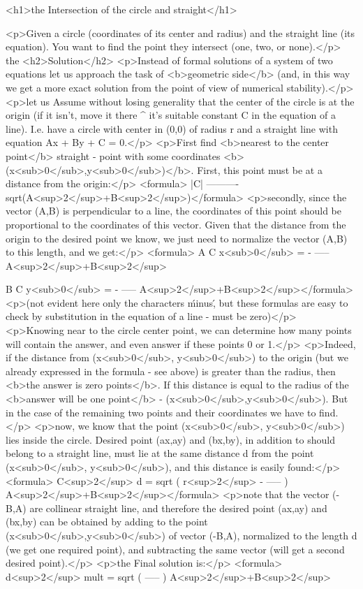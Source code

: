 <h1>the Intersection of the circle and straight</h1>

<p>Given a circle (coordinates of its center and radius) and the straight line (its equation). You want to find the point they intersect (one, two, or none).</p>
the <h2>Solution</h2>
<p>Instead of formal solutions of a system of two equations let us approach the task of <b>geometric side</b> (and, in this way we get a more exact solution from the point of view of numerical stability).</p>
<p>let us Assume without losing generality that the center of the circle is at the origin (if it isn't, move it there ^ it's suitable constant C in the equation of a line). I.e. have a circle with center in (0,0) of radius r and a straight line with equation Ax + By + C = 0.</p>
<p>First find <b>nearest to the center point</b> straight - point with some coordinates <b>(x<sub>0</sub>,y<sub>0</sub>)</b>. First, this point must be at a distance from the origin:</p>
<formula> |C|
----------
sqrt(A<sup>2</sup>+B<sup>2</sup>)</formula>
<p>secondly, since the vector (A,B) is perpendicular to a line, the coordinates of this point should be proportional to the coordinates of this vector. Given that the distance from the origin to the desired point we know, we just need to normalize the vector (A,B) to this length, and we get:</p>
<formula> A C
x<sub>0</sub> = - -----
A<sup>2</sup>+B<sup>2</sup>

B C
y<sub>0</sub> = - -----
A<sup>2</sup>+B<sup>2</sup></formula>
<p>(not evident here only the characters \'minus\', but these formulas are easy to check by substitution in the equation of a line - must be zero)</p>
<p>Knowing near to the circle center point, we can determine how many points will contain the answer, and even answer if these points 0 or 1.</p>
<p>Indeed, if the distance from (x<sub>0</sub>, y<sub>0</sub>) to the origin (but we already expressed in the formula - see above) is greater than the radius, then <b>the answer is zero points</b>. If this distance is equal to the radius of the <b>answer will be one point</b> - (x<sub>0</sub>,y<sub>0</sub>). But in the case of the remaining two points and their coordinates we have to find.</p>
<p>now, we know that the point (x<sub>0</sub>, y<sub>0</sub>) lies inside the circle. Desired point (ax,ay) and (bx,by), in addition to should belong to a straight line, must lie at the same distance d from the point (x<sub>0</sub>, y<sub>0</sub>), and this distance is easily found:</p>
<formula> C<sup>2</sup>
d = sqrt ( r<sup>2</sup> - ----- )
A<sup>2</sup>+B<sup>2</sup></formula>
<p>note that the vector (-B,A) are collinear straight line, and therefore the desired point (ax,ay) and (bx,by) can be obtained by adding to the point (x<sub>0</sub>,y<sub>0</sub>) of vector (-B,A), normalized to the length d (we get one required point), and subtracting the same vector (will get a second desired point).</p>
<p>the Final solution is:</p>
<formula> d<sup>2</sup>
mult = sqrt ( ----- )
A<sup>2</sup>+B<sup>2</sup>

